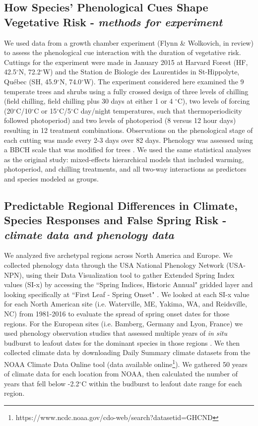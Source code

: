 \documentclass{article}\usepackage[]{graphicx}\usepackage[]{color}
\begin{document}
\subsection*{How Species' Phenological Cues Shape Vegetative Risk - \textit{methods for experiment}}
We used data from a growth chamber experiment (Flynn \& Wolkovich, in review) to assess the phenological cue interaction with the duration of vegetative risk. Cuttings for the experiment were made in January 2015 at Harvard Forest (HF, 42.5$^{\circ}$N, 72.2$^{\circ}$W) and the Station de Biologie des Laurentides in St-Hippolyte, Qu\'ebec (SH, 45.9$^{\circ}$N, 74.0$^{\circ}$W). The experiment considered here examined the 9 temperate trees and shrubs using a fully crossed design of three levels of chilling (field chilling, field chilling plus 30 days at either 1 or 4 $^{\circ}$C), two levels of forcing (20$^{\circ}$C/10$^{\circ}$C or 15$^{\circ}$C/5$^{\circ}$C day/night temperatures, such that thermoperiodicity followed photoperiod) and two levels of photoperiod (8 versus 12 hour days) resulting in 12 treatment combinations. Observations on the phenological stage of each cutting was made every 2-3 days over 82 days. Phenology was assessed using a BBCH scale that was modified for trees \citep{Finn2007}. We used the same statistical analyses as the original study: mixed-effects hierarchical models that included warming, photoperiod, and chilling treatments, and all two-way interactions as predictors and species modeled as groups.


\subsection*{Predictable Regional Differences in Climate, Species Responses and False Spring Risk - \textit{climate data and phenology data}}
We analyzed five archetypal regions across North America and Europe. We collected phenology data through the USA National Phenology Network (USA-NPN), using their Data Visualization tool to gather Extended Spring Index values (SI-x) by accessing the ``Spring Indices, Historic Annual" gridded layer and looking specifically at ``First Leaf - Spring Onset" \citep{SI-x2016}. We looked at each SI-x value for each North American site (i.e. Waterville, ME, Yakima, WA, and Reidsville, NC) from 1981-2016 to evaluate the spread of spring onset dates for those regions. For the European sites (i.e. Bamberg, Germany and Lyon, France) we used phenology observation studies that assessed multiple years of \textit{in situ} budburst to leafout dates for the dominant species in those regions \citep{Soudani2012, White2009,Schaber2005}. We then collected climate data by downloading Daily Summary climate datasets from the NOAA Climate Data Online tool (data available online\footnote{https://www.ncdc.noaa.gov/cdo-web/search?datasetid=GHCND}). We gathered 50 years of climate data for each location from NOAA, then calculated the number of years that fell below -2.2$^{\circ}$C within the budburst to leafout date range for each region. %
\end{document}
